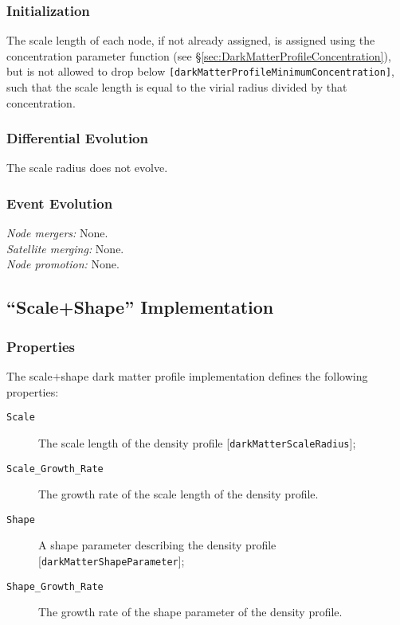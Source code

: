 \subsubsection{Initialization}

The scale length of each node, if not already assigned, is assigned using the concentration parameter function (see \S\ref{sec:DarkMatterProfileConcentration}), but is not allowed to drop below {\tt [darkMatterProfileMinimumConcentration]}, such that the scale length is equal to the virial radius divided by that concentration.

\subsubsection{Differential Evolution}

The scale radius does not evolve.

\subsubsection{Event Evolution}

\noindent\emph{Node mergers:} None.\\

\noindent\emph{Satellite merging:} None.\\

\noindent\emph{Node promotion:} None.\\

\subsection{``Scale+Shape'' Implementation}

\subsubsection{Properties}

The scale$+$shape dark matter profile implementation defines the following properties:
\begin{description}
 \item [{\tt Scale}] The scale length of the density profile [{\tt darkMatterScaleRadius}];
 \item [{\tt Scale\_Growth\_Rate}] The growth rate of the scale length of the density profile.
 \item [{\tt Shape}] A shape parameter describing the density profile [{\tt darkMatterShapeParameter}];
 \item [{\tt Shape\_Growth\_Rate}] The growth rate of the shape parameter of the density profile.
\end{description}

